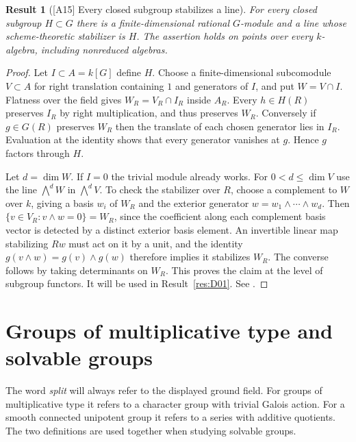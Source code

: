 \documentclass[11pt,a4paper,openany,oneside]{book}
\theoremstyle{resultstyle}
\newtheorem{statement}{Result}[chapter]
\newenvironment{result}[2]{\clubpenalty=10000\begin{statement}[\textnormal{[#1]} #2]\leavevmode\label{res:#1}\ignorespaces}{\end{statement}}
\theoremstyle{definition}
\numberwithin{equation}{chapter}
\begin{document}
\begin{result}{A15}{Every closed subgroup stabilizes a line}
For every closed subgroup \(H\subset G\) there is a finite-dimensional
rational \(G\)-module and a line whose scheme-theoretic stabilizer is \(H\).
The assertion holds on points over every \(k\)-algebra, including
nonreduced algebras.
\end{result}

\begin{proof}
Let \(I\subset A=k[G]\) define \(H\). Choose a finite-dimensional
subcomodule \(V\subset A\) for right translation containing \(1\) and
generators of \(I\), and put \(W=V\cap I\). Flatness over the field
gives \(W_R=V_R\cap I_R\) inside \(A_R\).
Every \(h\in H(R)\) preserves \(I_R\) by right multiplication, and
thus preserves \(W_R\). Conversely if \(g\in G(R)\) preserves \(W_R\)
then the translate of each chosen generator lies in \(I_R\).
Evaluation at the identity shows that every generator vanishes at
\(g\). Hence \(g\) factors through \(H\).

Let \(d=\dim W\). If \(I=0\) the trivial module already works.
For \(0<d\le\dim V\) use the line \(\bigwedge^d W\) in
\(\bigwedge^d V\). To check the stabilizer over \(R\), choose a
complement to \(W\) over \(k\), giving a basis \(w_i\) of \(W_R\) and
the exterior generator \(w=w_1\wedge\cdots\wedge w_d\).
Then
\(\{v\in V_R:v\wedge w=0\}=W_R\), since the coefficient along each
complement basis vector is detected by a distinct exterior basis
element. An invertible linear map stabilizing \(Rw\) must act on it
by a unit, and the identity
\(g(v\wedge w)=g(v)\wedge g(w)\) therefore implies it stabilizes \(W_R\).
The converse follows by taking determinants on \(W_R\).
This proves the claim at the level of subgroup functors. It will be
used in Result~\ref{res:D01}.
See \cite[Theorem 4.27, Lemma 4.28 and Remark 4.30]{milne}.
\end{proof}

\chapter{Groups of multiplicative type and solvable groups}
\label{chap:solvable-groups}

The word \emph{split} will always refer to the displayed ground field.
For groups of multiplicative type it refers to a character group with
trivial Galois action. For a smooth connected unipotent group it refers
to a series with additive quotients. The two definitions are used
together when studying solvable groups.
\end{document}
